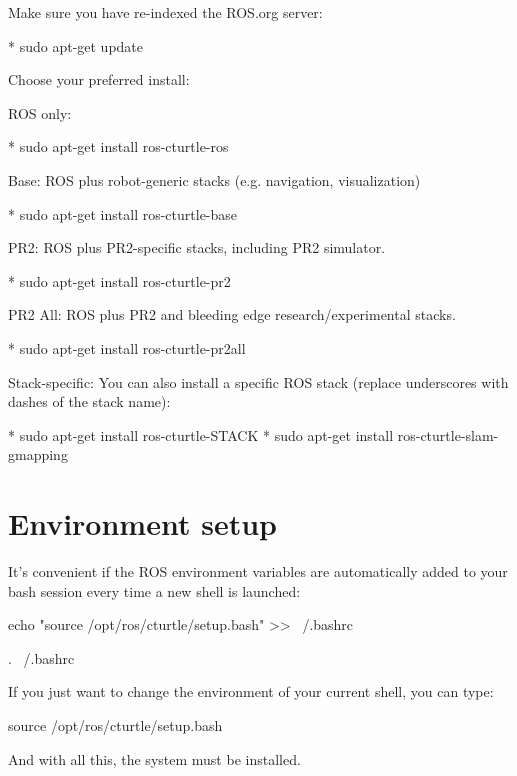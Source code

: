 Make sure you have re-indexed the ROS.org server:

    * sudo apt-get update



Choose your preferred install:

ROS only:

    * sudo apt-get install ros-cturtle-ros



Base: ROS plus robot-generic stacks (e.g. navigation, visualization)

    * sudo apt-get install ros-cturtle-base



PR2: ROS plus PR2-specific stacks, including PR2 simulator.

    * sudo apt-get install ros-cturtle-pr2



PR2 All: ROS plus PR2 and bleeding edge research/experimental stacks.

    * sudo apt-get install ros-cturtle-pr2all



Stack-specific: You can also install a specific ROS stack (replace underscores with dashes of the stack name):

    * sudo apt-get install ros-cturtle-STACK
    * sudo apt-get install ros-cturtle-slam-gmapping

\section{Environment setup}

It's convenient if the ROS environment variables are automatically added to your bash session every time a new shell is launched:

 echo "source /opt/ros/cturtle/setup.bash" >> ~/.bashrc

 . ~/.bashrc

If you just want to change the environment of your current shell, you can type:

 source /opt/ros/cturtle/setup.bash

And with all this, the system must be installed.


